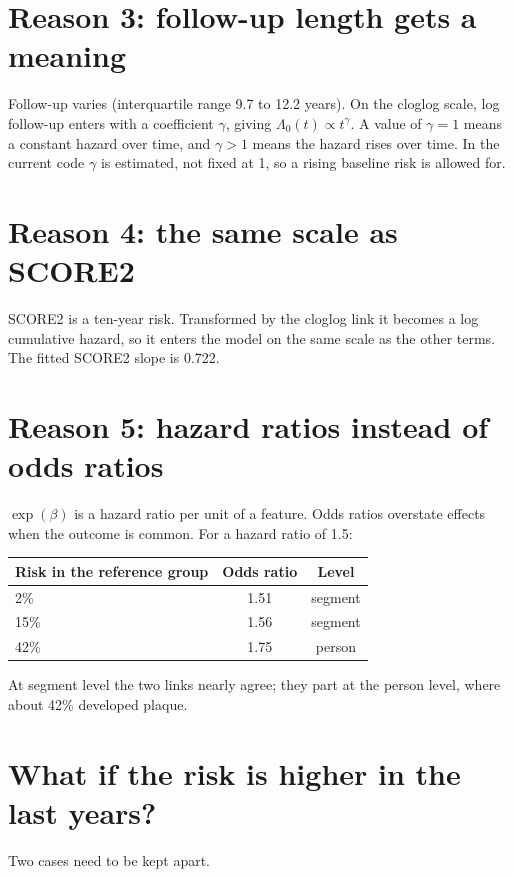 \documentclass[11pt]{article}
\begin{document}
\section*{Reason 3: follow-up length gets a meaning}

Follow-up varies (interquartile range 9.7 to 12.2 years). On the cloglog
scale, log follow-up enters with a coefficient $\gamma$, giving
$\Lambda_0(t) \propto t^{\gamma}$. A value of $\gamma = 1$ means a constant
hazard over time, and $\gamma > 1$ means the hazard rises over time. In the
current code $\gamma$ is estimated, not fixed at 1, so a rising baseline risk
is allowed for.

\section*{Reason 4: the same scale as SCORE2}

SCORE2 is a ten-year risk. Transformed by the cloglog link it becomes a log
cumulative hazard, so it enters the model on the same scale as the other
terms. The fitted SCORE2 slope is 0.722.

\section*{Reason 5: hazard ratios instead of odds ratios}

$\exp(\beta)$ is a hazard ratio per unit of a feature. Odds ratios overstate
effects when the outcome is common. For a hazard ratio of 1.5:

\begin{center}
\begin{tabular}{lcc}
\toprule
Risk in the reference group & Odds ratio & Level \\
\midrule
2\%  & 1.51 & segment \\
15\% & 1.56 & segment \\
42\% & 1.75 & person \\
\bottomrule
\end{tabular}
\end{center}

At segment level the two links nearly agree; they part at the person level,
where about 42\% developed plaque.

\section*{What if the risk is higher in the last years?}

Two cases need to be kept apart.
\end{document}
